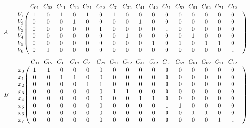 \documentclass{article}
\begin{document}
\begin{figure}[h]
\end{figure}
$$
 A =
\bordermatrix{ & C_{01} \!&\! C_{02} \!&\! C_{11} \!&\! C_{12} \!&\! C_{21} \!&\! C_{22} \!&\! C_{31} \!&\! C_{32} \!&\! C_{41} \!&\! C_{42} \!&\! C_{51} \!&\! C_{52} \!&\! C_{61} \!&\! C_{62} \!&\! C_{71} \!&\! C_{72} \!&\! \cr 
V_{1} \!&\! 1 \!&\! 0 \!&\! 1 \!&\! 0 \!&\! 1 \!&\! 0 \!&\! 1 \!&\! 0 \!&\! 0 \!&\! 0 \!&\! 0 \!&\! 0 \!&\! 0 \!&\! 0 \!&\! 0 \!&\! 0 \!&\! \cr
V_{2} \!&\! 0 \!&\! 0 \!&\! 0 \!&\! 1 \!&\! 0 \!&\! 0 \!&\! 0 \!&\! 0 \!&\! 1 \!&\! 0 \!&\! 0 \!&\! 0 \!&\! 0 \!&\! 0 \!&\! 0 \!&\! 0 \!&\! \cr
V_{3} \!&\! 0 \!&\! 0 \!&\! 0 \!&\! 0 \!&\! 0 \!&\! 1 \!&\! 0 \!&\! 0 \!&\! 0 \!&\! 0 \!&\! 1 \!&\! 0 \!&\! 0 \!&\! 0 \!&\! 0 \!&\! 0 \!&\! \cr
V_{4} \!&\! 0 \!&\! 0 \!&\! 0 \!&\! 0 \!&\! 0 \!&\! 0 \!&\! 0 \!&\! 1 \!&\! 0 \!&\! 0 \!&\! 0 \!&\! 0 \!&\! 1 \!&\! 0 \!&\! 0 \!&\! 0 \!&\! \cr
V_{5} \!&\! 0 \!&\! 0 \!&\! 0 \!&\! 0 \!&\! 0 \!&\! 0 \!&\! 0 \!&\! 0 \!&\! 0 \!&\! 1 \!&\! 0 \!&\! 1 \!&\! 0 \!&\! 1 \!&\! 1 \!&\! 0 \!&\! \cr
V_{6} \!&\! 0 \!&\! 1 \!&\! 0 \!&\! 0 \!&\! 0 \!&\! 0 \!&\! 0 \!&\! 0 \!&\! 0 \!&\! 0 \!&\! 0 \!&\! 0 \!&\! 0 \!&\! 0 \!&\! 0 \!&\! 1 \!&\! \cr
}$$
$$
B =
\bordermatrix{ & C_{01} \!&\! C_{02} \!&\! C_{11} \!&\! C_{12} \!&\! C_{21} \!&\! C_{22} \!&\! C_{31} \!&\! C_{32} \!&\! C_{41} \!&\! C_{42} \!&\! C_{51} \!&\! C_{52} \!&\! C_{61} \!&\! C_{62} \!&\! C_{71} \!&\! C_{72} \!&\! \cr 
x_{0} \!&\! 1 \!&\! 1 \!&\! 0 \!&\! 0 \!&\! 0 \!&\! 0 \!&\! 0 \!&\! 0 \!&\! 0 \!&\! 0 \!&\! 0 \!&\! 0 \!&\! 0 \!&\! 0 \!&\! 0 \!&\! 0 \!&\! \cr
x_{1} \!&\! 0 \!&\! 0 \!&\! 1 \!&\! 1 \!&\! 0 \!&\! 0 \!&\! 0 \!&\! 0 \!&\! 0 \!&\! 0 \!&\! 0 \!&\! 0 \!&\! 0 \!&\! 0 \!&\! 0 \!&\! 0 \!&\! \cr
x_{2} \!&\! 0 \!&\! 0 \!&\! 0 \!&\! 0 \!&\! 1 \!&\! 1 \!&\! 0 \!&\! 0 \!&\! 0 \!&\! 0 \!&\! 0 \!&\! 0 \!&\! 0 \!&\! 0 \!&\! 0 \!&\! 0 \!&\! \cr
x_{3} \!&\! 0 \!&\! 0 \!&\! 0 \!&\! 0 \!&\! 0 \!&\! 0 \!&\! 1 \!&\! 1 \!&\! 0 \!&\! 0 \!&\! 0 \!&\! 0 \!&\! 0 \!&\! 0 \!&\! 0 \!&\! 0 \!&\! \cr
x_{4} \!&\! 0 \!&\! 0 \!&\! 0 \!&\! 0 \!&\! 0 \!&\! 0 \!&\! 0 \!&\! 0 \!&\! 1 \!&\! 1 \!&\! 0 \!&\! 0 \!&\! 0 \!&\! 0 \!&\! 0 \!&\! 0 \!&\! \cr
x_{5} \!&\! 0 \!&\! 0 \!&\! 0 \!&\! 0 \!&\! 0 \!&\! 0 \!&\! 0 \!&\! 0 \!&\! 0 \!&\! 0 \!&\! 1 \!&\! 1 \!&\! 0 \!&\! 0 \!&\! 0 \!&\! 0 \!&\! \cr
x_{6} \!&\! 0 \!&\! 0 \!&\! 0 \!&\! 0 \!&\! 0 \!&\! 0 \!&\! 0 \!&\! 0 \!&\! 0 \!&\! 0 \!&\! 0 \!&\! 0 \!&\! 1 \!&\! 1 \!&\! 0 \!&\! 0 \!&\! \cr
x_{7} \!&\! 0 \!&\! 0 \!&\! 0 \!&\! 0 \!&\! 0 \!&\! 0 \!&\! 0 \!&\! 0 \!&\! 0 \!&\! 0 \!&\! 0 \!&\! 0 \!&\! 0 \!&\! 0 \!&\! 1 \!&\! 1 \!&\! \cr
}$$
\end{document}
